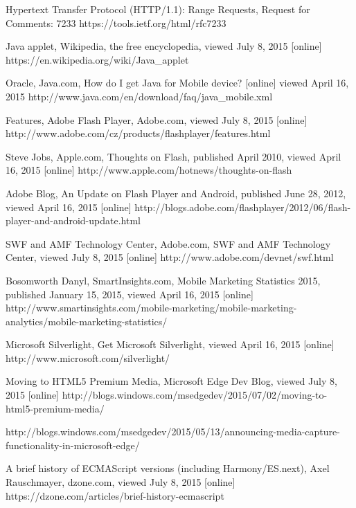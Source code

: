 \begin{thebibliography}{99}
Hypertext Transfer Protocol (HTTP/1.1): Range Requests, Request for Comments: 7233
https://tools.ietf.org/html/rfc7233


Java applet, Wikipedia, the free encyclopedia, viewed July 8, 2015 [online]
https://en.wikipedia.org/wiki/Java\_applet

Oracle, Java.com, How do I get Java for Mobile device? [online] viewed April 16, 2015
http://www.java.com/en/download/faq/java\_mobile.xml

Features, Adobe Flash Player, Adobe.com, viewed July 8, 2015 [online]
http://www.adobe.com/cz/products/flashplayer/features.html

Steve Jobs, Apple.com, Thoughts on Flash, published April 2010, viewed April 16, 2015 [online]
http://www.apple.com/hotnews/thoughts-on-flash

Adobe Blog, An Update on Flash Player and Android, published June 28, 2012, viewed April 16, 2015 [online]
http://blogs.adobe.com/flashplayer/2012/06/flash-player-and-android-update.html

SWF and AMF Technology Center, Adobe.com, SWF and AMF Technology Center, viewed July 8, 2015 [online]
http://www.adobe.com/devnet/swf.html

Bosomworth Danyl, SmartInsights.com, Mobile Marketing Statistics 2015, published January 15, 2015, viewed April 16, 2015 [online]
http://www.smartinsights.com/mobile-marketing/mobile-marketing-analytics/mobile-marketing-statistics/

Microsoft Silverlight, Get Microsoft Silverlight, viewed April 16, 2015 [online]
http://www.microsoft.com/silverlight/

Moving to HTML5 Premium Media, Microsoft Edge Dev Blog, viewed July 8, 2015 [online]
http://blogs.windows.com/msedgedev/2015/07/02/moving-to-html5-premium-media/

http://blogs.windows.com/msedgedev/2015/05/13/announcing-media-capture-functionality-in-microsoft-edge/

A brief history of ECMAScript versions (including Harmony/ES.next),  Axel Rauschmayer, dzone.com, viewed July 8, 2015 [online]
https://dzone.com/articles/brief-history-ecmascript


\end{thebibliography}
